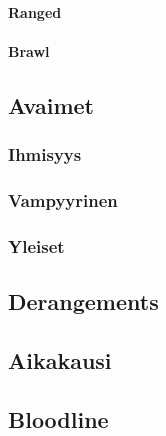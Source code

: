 \documentclass[a4paper, 12pt, finnish]{report}
\begin{document}
{			\paragraph{Ranged}
			\paragraph{Brawl}
	\subsection{Avaimet}
		\subsubsection{Ihmisyys}
		\subsubsection{Vampyyrinen}
		\subsubsection{Yleiset}
	\subsection{Derangements}
	\subsection{Aikakausi}
	\subsection{Bloodline}
}
\end{document}
